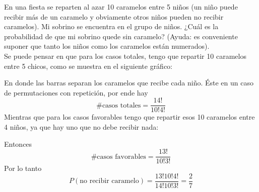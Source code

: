 \item En una fiesta se reparten al azar 10 caramelos entre 5 niños (un niño puede recibir más de un caramelo y obviamente otros niños pueden no recibir caramelos). Mi sobrino se encuentra en el grupo de niños. ¿Cuál es la probabilidad de que mi sobrino quede sin caramelo? (Ayuda: es conveniente suponer que tanto los niños como los caramelos están numerados).\e\\
    Se puede pensar en que para los casos totales, tengo que repartir 10 caramelos entre 5 chicos, como se muestra en el siguiente gráfico:
    \begin{center}
    \end{center}
    En donde las barras separan los caramelos que recibe cada niño. Éste en un caso de permutaciones con repetición, por ende hay\[\#\text{casos totales}=\frac{14!}{10!4!}\]
    Mientras que para los casos favorables tengo que repartir esos 10 caramelos entre 4 niños, ya que hay uno que no debe recibir nada:
    \begin{center}
    \end{center}
    Entonces\[\#\text{casos favorables}=\frac{13!}{10!3!}\]
    Por lo tanto\[P(\text{no recibir caramelo})=\frac{13!10!4!}{14!10!3!}=\frac{2}{7}\]